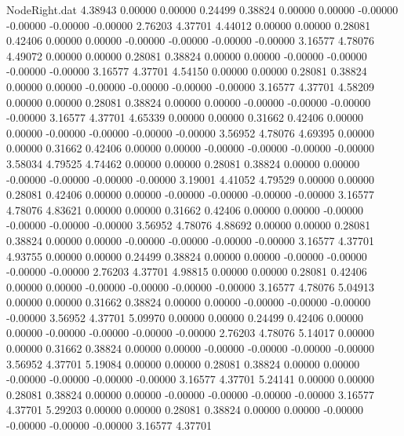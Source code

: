 \begin{filecontents}{NodeRight.dat}
   4.38943    0.00000    0.00000     0.24499    0.38824    0.00000    0.00000   -0.00000   -0.00000   -0.00000   -0.00000    2.76203    4.37701
   4.44012    0.00000    0.00000     0.28081    0.42406    0.00000    0.00000   -0.00000   -0.00000   -0.00000   -0.00000    3.16577    4.78076
   4.49072    0.00000    0.00000     0.28081    0.38824    0.00000    0.00000   -0.00000   -0.00000   -0.00000   -0.00000    3.16577    4.37701
   4.54150    0.00000    0.00000     0.28081    0.38824    0.00000    0.00000   -0.00000   -0.00000   -0.00000   -0.00000    3.16577    4.37701
   4.58209    0.00000    0.00000     0.28081    0.38824    0.00000    0.00000   -0.00000   -0.00000   -0.00000   -0.00000    3.16577    4.37701
   4.65339    0.00000    0.00000     0.31662    0.42406    0.00000    0.00000   -0.00000   -0.00000   -0.00000   -0.00000    3.56952    4.78076
   4.69395    0.00000    0.00000     0.31662    0.42406    0.00000    0.00000   -0.00000   -0.00000   -0.00000   -0.00000    3.58034    4.79525
   4.74462    0.00000    0.00000     0.28081    0.38824    0.00000    0.00000   -0.00000   -0.00000   -0.00000   -0.00000    3.19001    4.41052
   4.79529    0.00000    0.00000     0.28081    0.42406    0.00000    0.00000   -0.00000   -0.00000   -0.00000   -0.00000    3.16577    4.78076
   4.83621    0.00000    0.00000     0.31662    0.42406    0.00000    0.00000   -0.00000   -0.00000   -0.00000   -0.00000    3.56952    4.78076
   4.88692    0.00000    0.00000     0.28081    0.38824    0.00000    0.00000   -0.00000   -0.00000   -0.00000   -0.00000    3.16577    4.37701
   4.93755    0.00000    0.00000     0.24499    0.38824    0.00000    0.00000   -0.00000   -0.00000   -0.00000   -0.00000    2.76203    4.37701
   4.98815    0.00000    0.00000     0.28081    0.42406    0.00000    0.00000   -0.00000   -0.00000   -0.00000   -0.00000    3.16577    4.78076
   5.04913    0.00000    0.00000     0.31662    0.38824    0.00000    0.00000   -0.00000   -0.00000   -0.00000   -0.00000    3.56952    4.37701
   5.09970    0.00000    0.00000     0.24499    0.42406    0.00000    0.00000   -0.00000   -0.00000   -0.00000   -0.00000    2.76203    4.78076
   5.14017    0.00000    0.00000     0.31662    0.38824    0.00000    0.00000   -0.00000   -0.00000   -0.00000   -0.00000    3.56952    4.37701
   5.19084    0.00000    0.00000     0.28081    0.38824    0.00000    0.00000   -0.00000   -0.00000   -0.00000   -0.00000    3.16577    4.37701
   5.24141    0.00000    0.00000     0.28081    0.38824    0.00000    0.00000   -0.00000   -0.00000   -0.00000   -0.00000    3.16577    4.37701
   5.29203    0.00000    0.00000     0.28081    0.38824    0.00000    0.00000   -0.00000   -0.00000   -0.00000   -0.00000    3.16577    4.37701

\end{filecontents}
